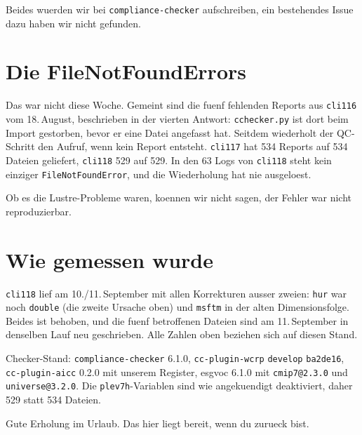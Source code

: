 \documentclass[11pt,a4paper]{article}
\newcommand{\code}[1]{\texttt{\small #1}}
\begin{document}
Beides wuerden wir bei \code{compliance-checker} aufschreiben, ein bestehendes
Issue dazu haben wir nicht gefunden.

\section{Die FileNotFoundErrors}

Das war nicht diese Woche. Gemeint sind die fuenf fehlenden Reports aus
\code{cli116} vom 18.\,August, beschrieben in der vierten Antwort:
\code{cchecker.py} ist dort beim Import gestorben, bevor er eine Datei
angefasst hat. Seitdem wiederholt der QC-Schritt den Aufruf, wenn kein Report
entsteht. \code{cli117} hat 534 Reports auf 534 Dateien geliefert,
\code{cli118} 529 auf 529. In den 63 Logs von \code{cli118} steht kein einziger
\code{FileNotFoundError}, und die Wiederholung hat nie ausgeloest.

Ob es die Lustre-Probleme waren, koennen wir nicht sagen, der Fehler war nicht
reproduzierbar.

\section{Wie gemessen wurde}
\label{sec:nach}

\code{cli118} lief am 10./11.\,September mit allen Korrekturen ausser zweien:
\code{hur} war noch \code{double} (die zweite Ursache oben) und \code{msftm} in der
alten Dimensionsfolge. Beides ist behoben, und die fuenf betroffenen Dateien
sind am 11.\,September in denselben Lauf neu geschrieben. Alle Zahlen oben
beziehen sich auf diesen Stand.

Checker-Stand: \code{compliance-checker} 6.1.0, \code{cc-plugin-wcrp}
\code{develop} \code{ba2de16}, \code{cc-plugin-aicc} 0.2.0 mit unserem Register,
esgvoc 6.1.0 mit \code{cmip7@2.3.0} und \code{universe@3.2.0}. Die
\code{plev7h}-Variablen sind wie angekuendigt deaktiviert, daher 529 statt 534
Dateien.

Gute Erholung im Urlaub. Das hier liegt bereit, wenn du zurueck bist.
\end{document}
